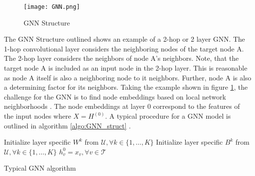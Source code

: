 	\begin{figure}
		\centering
		\texttt{[image: GNN.png]}
		\caption{GNN Structure}
		\cite{leskovec2021lecture}
		\label{fig:GNN_structure}
	\end{figure}


	\noindent The GNN Structure outlined shows an example of a 2-hop or 2 layer GNN. 
	The 1-hop convolutional layer considers the neighboring nodes of the target node A. 
	The 2-hop layer considers the neighbors of node A's neighbors. Note, that the 
	target node A is included as an input node in the 2-hop layer. This is reasonable 
	as node A itself is also a neighboring node to it neighbors. Further, node 
	A is also a determining factor for its neighbors. Taking the example shown in
	figure \ref{fig:GNN_structure}, the challenge for the GNN is to find node
	embeddings based on local network neighborhoods
	\citep{leskovec2021lecture}. The node embeddings at layer 0 correspond to
	the features of the input nodes where $X = H^{(0)}$. A typical procedure
	for a GNN model is outlined in algorithm \ref{algo:GNN_struct}
	\citep{hamilton2017inductive,leskovec2021lecture,you2020design}.
	

	\begin{algorithm}
		\scriptsize
		\SetAlgoLined
		\nl Initialize layer specific $W^{k}$ from $\mathcal{U},\forall k \in 
			\{1,\dots,K\}$\;
		\nl Initialize layer specific $B^{k}$ from $\mathcal{U},\forall k \in
			\{1,\dots,K\}$\;
		\nl $h_{v}^{0} = x_{v},\forall v \in \mathcal{T}$\\
		\nl {}
		\caption{Typical GNN algorithm}
		\label{algo:GNN_struct}
	\end{algorithm}


